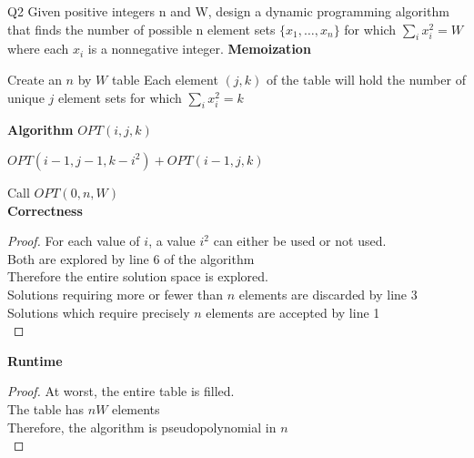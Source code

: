 \begin{problem}
  {Q2}
  Given positive integers n and W, design a dynamic programming algorithm that finds
  the number of possible n element sets $\{x_1, \dots , x_n\}$ for which $\sum_i x_i^2 = W$ where each
  $x_i$ is a nonnegative integer.
  \noindent
  \textbf{Memoization}
  \begin{algorithmic}[1]
    \STATE Create an $n$ by $W$ table
    \STATE Each element $(j, k)$ of the table will hold the number of unique $j$ element sets for which $\sum_i x_i^2 = k$
  \end{algorithmic}
  \textbf{Algorithm}
  $OPT(i, j, k)$
  \begin{algorithmic}[1]
    \ENDIF
    \RETURN $OPT(i-1, j-1, k-i^2) + OPT(i-1, j, k)$
  \end{algorithmic}
  Call $OPT(0, n, W)$ \\
  \textbf{Correctness}
  \begin{proof}
    For each value of $i$, a value $i^2$ can either be used or not used. \\
    Both are explored by line 6 of the algorithm \\
    Therefore the entire solution space is explored. \\
    Solutions requiring more or fewer than $n$ elements are discarded by line 3 \\
    Solutions which require precisely $n$ elements are accepted by line 1 \\
  \end{proof}
  \noindent
  \textbf{Runtime}
  \begin{proof}
      At worst, the entire table is filled. \\
      The table has $nW$ elements \\
      Therefore, the algorithm is pseudopolynomial in $n$ \\
  \end{proof}
\end{problem}
